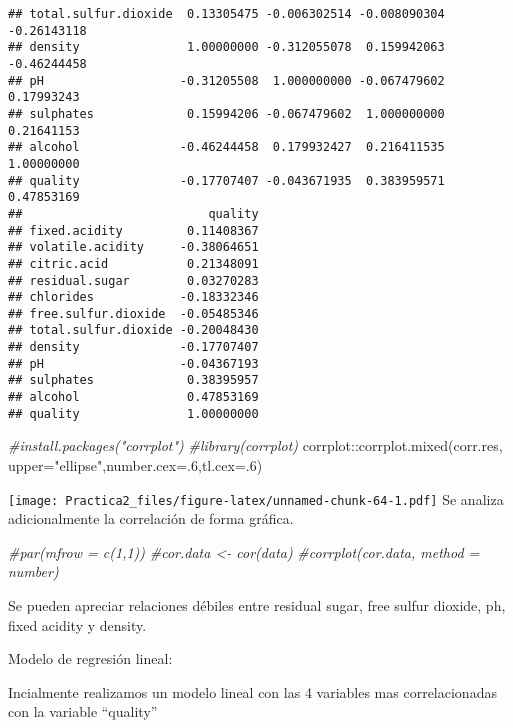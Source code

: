 \documentclass[
]{article}
\newenvironment{Shaded}{\begin{snugshade}}{\end{snugshade}}
\newcommand{\AttributeTok}[1]{\textcolor[rgb]{0.77,0.63,0.00}{#1}}
\newcommand{\CommentTok}[1]{\textcolor[rgb]{0.56,0.35,0.01}{\textit{#1}}}
\newcommand{\DecValTok}[1]{\textcolor[rgb]{0.00,0.00,0.81}{#1}}
\newcommand{\FunctionTok}[1]{\textcolor[rgb]{0.00,0.00,0.00}{#1}}
\newcommand{\NormalTok}[1]{#1}
\newcommand{\SpecialCharTok}[1]{\textcolor[rgb]{0.00,0.00,0.00}{#1}}
\newcommand{\StringTok}[1]{\textcolor[rgb]{0.31,0.60,0.02}{#1}}
\begin{document}
\begin{verbatim}
## total.sulfur.dioxide  0.13305475 -0.006302514 -0.008090304 -0.26143118
## density               1.00000000 -0.312055078  0.159942063 -0.46244458
## pH                   -0.31205508  1.000000000 -0.067479602  0.17993243
## sulphates             0.15994206 -0.067479602  1.000000000  0.21641153
## alcohol              -0.46244458  0.179932427  0.216411535  1.00000000
## quality              -0.17707407 -0.043671935  0.383959571  0.47853169
##                          quality
## fixed.acidity         0.11408367
## volatile.acidity     -0.38064651
## citric.acid           0.21348091
## residual.sugar        0.03270283
## chlorides            -0.18332346
## free.sulfur.dioxide  -0.05485346
## total.sulfur.dioxide -0.20048430
## density              -0.17707407
## pH                   -0.04367193
## sulphates             0.38395957
## alcohol               0.47853169
## quality               1.00000000
\end{verbatim}

\begin{Shaded}
\begin{Highlighting}[]
\CommentTok{\#install.packages("corrplot")}
\CommentTok{\#library(corrplot)}
\NormalTok{corrplot}\SpecialCharTok{::}\FunctionTok{corrplot.mixed}\NormalTok{(corr.res, }\AttributeTok{upper=}\StringTok{"ellipse"}\NormalTok{,}\AttributeTok{number.cex=}\NormalTok{.}\DecValTok{6}\NormalTok{,}\AttributeTok{tl.cex=}\NormalTok{.}\DecValTok{6}\NormalTok{)}
\end{Highlighting}
\end{Shaded}

\texttt{[image: Practica2\_files/figure-latex/unnamed-chunk-64-1.pdf]} Se
analiza adicionalmente la correlación de forma gráfica.

\begin{Shaded}
\begin{Highlighting}[]
\CommentTok{\#par(mfrow = c(1,1))}
\CommentTok{\#cor.data \textless{}{-} cor(data)}
\CommentTok{\#corrplot(cor.data, method = \textquotesingle{}number\textquotesingle{})}
\end{Highlighting}
\end{Shaded}

Se pueden apreciar relaciones débiles entre residual sugar, free sulfur
dioxide, ph, fixed acidity y density.

Modelo de regresión lineal:

Incialmente realizamos un modelo lineal con las 4 variables mas
correlacionadas con la variable ``quality''
\end{document}
